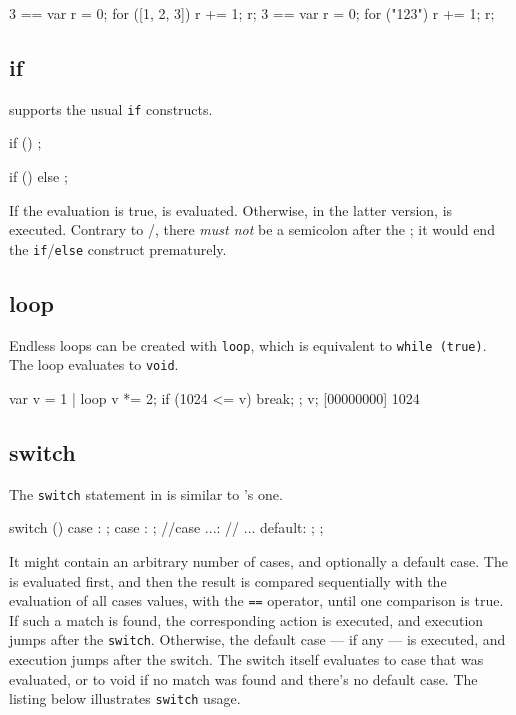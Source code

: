 \begin{urbiassert}[firstnumber=last]
3 == { var r = 0; for ([1, 2, 3]) r += 1; r};
3 == { var r = 0; for ("123")     r += 1; r};
\end{urbiassert}


\subsection{if}

\us supports the usual \lstinline|if| constructs.

\begin{urbiunchecked}[frame=, backgroundcolor=, ]
if ()
  ;

if ()
else
  ;
\end{urbiunchecked}

If the  evaluation is true,  is
evaluated. Otherwise, in the latter version,  is
executed.  Contrary to \C/\Cxx, there \emph{must not} be a semicolon
after the ; it would end the
\lstinline|if|/\lstinline|else| construct prematurely.

\subsection{loop}

Endless loops can be created with \lstinline|loop|, which is
equivalent to \lstinline|while (true)|.  The loop evaluates to
\lstinline|void|.

\begin{urbiscript}[firstnumber=last]
var v = 1 |
loop
{
  v *= 2;
  if (1024 <= v)
    break;
};
v;
[00000000] 1024
\end{urbiscript}

\subsection{switch}

The \lstinline|switch| statement in \us is similar to \C's one.

\begin{urbiunchecked}[frame=, backgroundcolor=, ]
switch ()
{
  case :
    ;
  case :
    ;
//case ...:
//  ...
  default:
    ;
};
\end{urbiunchecked}

It might contain an arbitrary number of cases, and optionally a
default case. The  is evaluated first, and then the
result is compared sequentially with the evaluation of all cases
values, with the \lstinline|==| operator, until one comparison is
true. If such a match is found, the corresponding action is executed,
and execution jumps after the \lstinline|switch|. Otherwise, the
default case --- if any --- is executed, and execution jumps after the
switch. The switch itself evaluates to case that was evaluated, or to
void if no match was found and there's no default case. The listing below
illustrates \lstinline|switch| usage.

